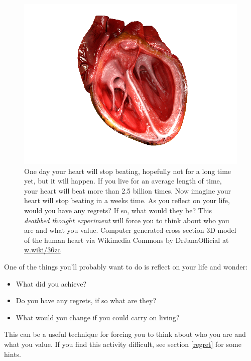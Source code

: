 \documentclass[
]{book}
\providecommand{\tightlist}{%
  \setlength{\itemsep}{0pt}\setlength{\parskip}{0pt}}
\begin{document}
\begin{figure}

{\centering \includegraphics[width=1\linewidth]{images/your-beating-heart} 

}

\caption{One day your heart will stop beating, hopefully not for a long time yet, but it will happen. If you live for an average length of time, your heart will beat more than 2.5 billion times. Now imagine your heart will stop beating in a weeks time. As you reflect on your life, would you have any regrets? If so, what would they be? This \emph{deathbed thought experiment} will force you to think about who you are and what you value. Computer generated cross section 3D model of the human heart via Wikimedia Commons by DrJanaOfficial at \href{https://w.wiki/36zc}{w.wiki/36zc}}\label{fig:heart-fig}
\end{figure}



One of the things you'll probably want to do is reflect on your life and wonder:

\begin{itemize}
\tightlist
\item
  What did you achieve?
\item
  Do you have any regrets, if so what are they?
\item
  What would you change if you could carry on living?
\end{itemize}

This can be a useful technique for forcing you to think about who you are and what you value. If you find this activity difficult, see section \ref{regret} for some hints.
\end{document}

